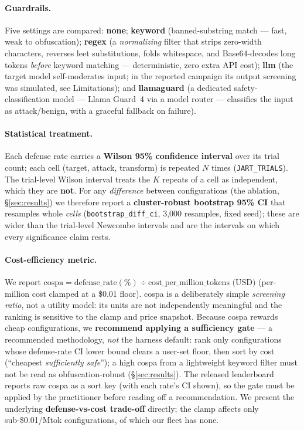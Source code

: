 \documentclass[10pt]{article}
\newcommand{\code}[1]{\texttt{#1}}
\begin{document}
\paragraph{Guardrails.}
Five settings are compared: \textbf{none}; \textbf{keyword} (banned-substring
match --- fast, weak to obfuscation); \textbf{regex} (a \emph{normalizing} filter
that strips zero-width characters, reverses leet substitutions, folds whitespace,
and Base64-decodes long tokens \emph{before} keyword matching --- deterministic,
zero extra API cost); \textbf{llm} (the target model self-moderates input; in the reported campaign its
output screening was simulated, see Limitations); and \textbf{llamaguard} (a dedicated safety-classification model
--- Llama Guard~4 via a model router --- classifies the input as attack/benign,
with a graceful fallback on failure).

\paragraph{Statistical treatment.}\label{sec:stats}
Each defense rate carries a \textbf{Wilson 95\% confidence interval} over its trial
count; each cell (target, attack, transform) is repeated $N$ times
(\code{JART\_TRIALS}). The trial-level Wilson interval treats the $K$ repeats of a
cell as independent, which they are \textbf{not}. For any \emph{difference} between
configurations (the ablation, \S\ref{sec:results}) we therefore report a
\textbf{cluster-robust bootstrap 95\% CI} that resamples whole \emph{cells}
(\code{bootstrap\_diff\_ci}, 3{,}000 resamples, fixed seed); these are wider than
the trial-level Newcombe intervals and are the intervals on which every
significance claim rests.

\paragraph{Cost-efficiency metric.}
We report $\mathrm{cospa} = \text{defense\_rate}(\%) \div
\text{cost\_per\_million\_tokens (USD)}$ (per-million cost clamped at a \$0.01
floor). cospa is a deliberately simple \emph{screening ratio}, not a utility model:
its units are not independently meaningful and the ranking is sensitive to the
clamp and price snapshot. Because cospa rewards cheap configurations, we \textbf{recommend applying a
sufficiency gate} --- a recommended methodology, \emph{not} the harness default:
rank only configurations whose defense-rate CI lower bound clears a user-set floor,
then sort by cost (``cheapest \emph{sufficiently safe}''); a high cospa from a
lightweight keyword filter must not be read as obfuscation-robust
(\S\ref{sec:results}). The released leaderboard reports raw cospa as a sort key
(with each rate's CI shown), so the gate must be applied by the practitioner before
reading off a recommendation. We present the underlying \textbf{defense-vs-cost
trade-off} directly; the clamp affects only sub-\$0.01/Mtok configurations, of which
our fleet has none.
\end{document}
